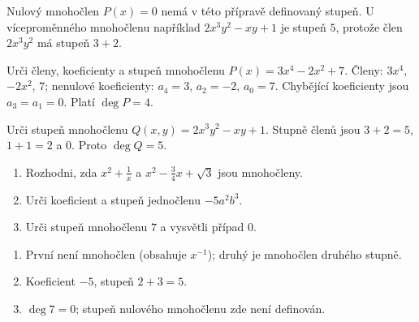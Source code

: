 \documentclass[11pt,a4paper]{article}
\begin{document}
Nulový mnohočlen $P(x)=0$ nemá v této přípravě definovaný stupeň. U víceproměnného mnohočlenu například $2x^3y^2-xy+1$ je stupeň $5$, protože člen $2x^3y^2$ má stupeň $3+2$.



\begin{prikladReseniBox}[title={Příklad 3},breakable=false]
Urči členy, koeficienty a stupeň mnohočlenu $P(x)=3x^4-2x^2+7$.
\tcblower
Členy: $3x^4$, $-2x^2$, $7$; nenulové koeficienty: $a_4=3$, $a_2=-2$, $a_0=7$. Chybějící koeficienty jsou $a_3=a_1=0$. Platí $\deg P=4$.
\end{prikladReseniBox}

\begin{prikladReseniBox}[title={Příklad 4},breakable=false]
Urči stupeň mnohočlenu $Q(x,y)=2x^3y^2-xy+1$.
\tcblower
Stupně členů jsou $3+2=5$, $1+1=2$ a $0$. Proto $\deg Q=5$.
\end{prikladReseniBox}


\begin{zadaniReseniBox}[title={Samostatná práce 1},breakable=false]
\begin{enumerate}[label=\alph*)]
\item Rozhodni, zda $x^2+\frac1x$ a $x^2-\frac34x+\sqrt3$ jsou mnohočleny.
\item Urči koeficient a stupeň jednočlenu $-5a^2b^3$.
\item Urči stupeň mnohočlenu $7$ a vysvětli případ $0$.
\end{enumerate}
\tcblower
\begin{enumerate}[label=\alph*)]
\item První není mnohočlen (obsahuje $x^{-1}$); druhý je mnohočlen druhého stupně.
\item Koeficient $-5$, stupeň $2+3=5$.
\item $\deg 7=0$; stupeň nulového mnohočlenu zde není definován.
\end{enumerate}
\end{zadaniReseniBox}

\end{document}
